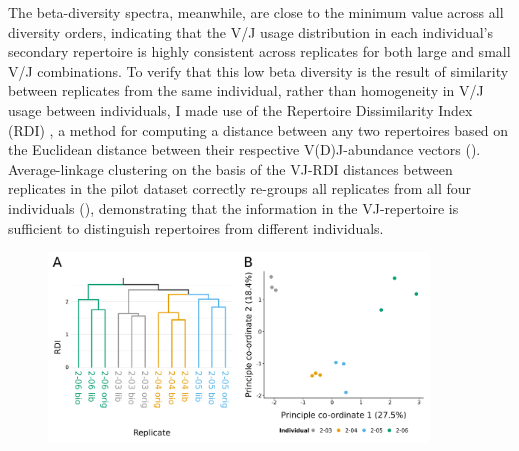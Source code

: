 The beta-diversity spectra, meanwhile, are close to the minimum value across all diversity orders, indicating that the V/J usage distribution in each individual's secondary repertoire is highly consistent across replicates for both large and small V/J combinations. To verify that this low beta diversity is the result of similarity between replicates from the same individual, rather than homogeneity in V/J usage between individuals, I made use of the Repertoire Dissimilarity Index (RDI) \parencite{bolen2017rdi}, a method for computing a distance between any two repertoires based on the Euclidean distance between their respective V(D)J-abundance vectors (). Average-linkage clustering on the basis of the VJ-RDI distances between replicates in the pilot dataset correctly re-groups all replicates from all four individuals (), demonstrating that the information in the VJ-repertoire is sufficient to distinguish repertoires from different individuals.

\begin{figure}
\centering
\includegraphics[width = 0.9\textwidth]{_Figures/png/pilot-rdi-vj-replicate}
\begin{subfigure}{0em}
\label{fig:igseq-pilot-rdi-dendrogram}
\end{subfigure}
\begin{subfigure}{0em}
\label{fig:igseq-pilot-rdi-pcoa}
\end{subfigure}
\label{fig:igseq-pilot-rdi}
\end{figure}

